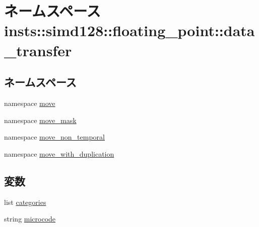 \hypertarget{namespaceinsts_1_1simd128_1_1floating__point_1_1data__transfer}{
\section{ネームスペース insts::simd128::floating\_\-point::data\_\-transfer}
\label{namespaceinsts_1_1simd128_1_1floating__point_1_1data__transfer}
}
\subsection*{ネームスペース}
\begin{DoxyCompactItemize}
\item 
namespace \hyperlink{namespaceinsts_1_1simd128_1_1floating__point_1_1data__transfer_1_1move}{move}
\item 
namespace \hyperlink{namespaceinsts_1_1simd128_1_1floating__point_1_1data__transfer_1_1move__mask}{move\_\-mask}
\item 
namespace \hyperlink{namespaceinsts_1_1simd128_1_1floating__point_1_1data__transfer_1_1move__non__temporal}{move\_\-non\_\-temporal}
\item 
namespace \hyperlink{namespaceinsts_1_1simd128_1_1floating__point_1_1data__transfer_1_1move__with__duplication}{move\_\-with\_\-duplication}
\end{DoxyCompactItemize}
\subsection*{変数}
\begin{DoxyCompactItemize}
\item 
list \hyperlink{namespaceinsts_1_1simd128_1_1floating__point_1_1data__transfer_a273cf0f1630af14c1582f05e53354a55}{categories}
\item 
string \hyperlink{namespaceinsts_1_1simd128_1_1floating__point_1_1data__transfer_a770f11a173e99389a8802f0107ed8f52}{microcode}
\end{DoxyCompactItemize}


